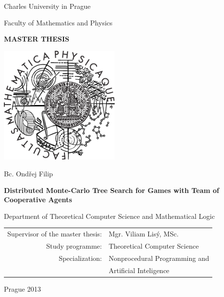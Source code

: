 \documentclass[12pt,a4paper]{report}
\numberwithin{algocf}{chapter} %
\begin{document}


\pagestyle{empty}
\begin{center}

\large

Charles University in Prague

\medskip

Faculty of Mathematics and Physics

\vfill

{\bf\Large MASTER THESIS}

\vfill

\centerline{\mbox{\includegraphics[width=60mm]{img/logo.eps}}}

\vfill
\vspace{5mm}

{\LARGE Bc. Ondřej Filip}

\vspace{15mm}

{\LARGE\bfseries Distributed Monte-Carlo Tree Search for Games with Team of Cooperative Agents}

\vfill

Department of Theoretical Computer Science and Mathematical Logic

\vfill

\begin{tabular}{rl}

Supervisor of the master thesis: & Mgr. Viliam Lisý, MSc. \\
\noalign{\vspace{2mm}}
Study programme: & Theoretical Computer Science \\
\noalign{\vspace{2mm}}
Specialization: & Nonprocedural Programming and \\
                & Artificial Inteligence \\
\end{tabular}

\vfill

Prague 2013

\end{center}
\end{document}
